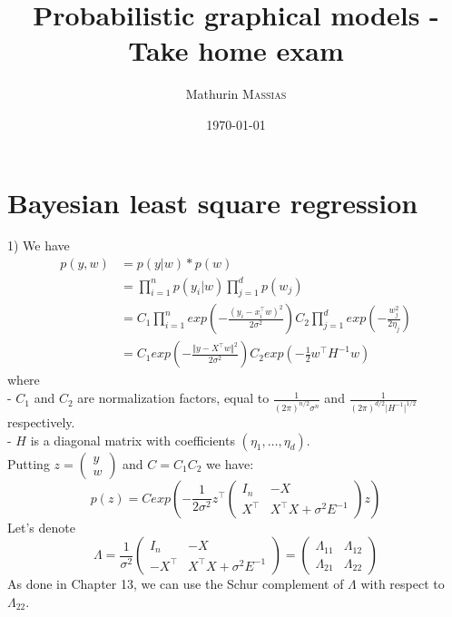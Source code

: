 \documentclass[11pt,a4paper]{article}
\begin{document}
	\title{Probabilistic graphical models - Take home exam}
	\author{Mathurin \textsc{Massias}}
	\date{\today} 
	\maketitle
\hspace{-6mm}

\section{Bayesian least square regression}

1) We have 
$$ \begin{aligned}p(y, w) 
&= p(y \vert w) * p(w) 
\\&= \prod\limits_{i=1}^{n} p(y_i \vert w) \prod\limits_{j=1}^{d} p( w_j)  
\\&=C_1 \prod\limits_{i=1}^{n} exp(- \frac{( y_i - x_i^{\top}w )^2 } {2 \sigma^2}) C_2 \prod\limits_{j=1}^{d} exp(- \frac{w_j^2}{2 \eta_j})
\\&=C_1 exp(- \frac{\Vert y- X^{\top}w \Vert^2 } {2 \sigma^2}) C_2 exp(-\frac{1}{2} w^{\top} H ^{-1} w)
\end{aligned}$$
where 
\\- $C_1$ and $C_2$ are normalization factors, equal to $\frac{1}{(2\pi)^{n/2} \sigma^n}$ and $\frac{1}{(2 \pi)^{d/2} \vert H^{-1} \vert^{1/2}}$ respectively.
\\- $H$ is a diagonal matrix with coefficients $(\eta_1, \ldots, \eta_d)$.
%
\\[5mm]Putting $z = \begin{pmatrix} y \\ w \end{pmatrix}$ and $C = C_1C_2$ we have:
$$p(z) = C exp (-\frac{1}{2\sigma^2} z^{\top} 
\begin{pmatrix} I_n & -X
\\ X^{\top} & X^{\top}X + \sigma^2 E^{-1} \end{pmatrix}
z)$$
%
Let's denote $$\Lambda = \frac{1}{\sigma^2}\begin{pmatrix} I_n & -X
\\ -X^{\top} & X^{\top}X + \sigma^2 E^{-1} \end{pmatrix}
 = \begin{pmatrix} \Lambda_{11} & \Lambda_{12}
\\ \Lambda_{21} & \Lambda_{22}  \end{pmatrix}
$$
As done in Chapter 13, we can use the Schur complement of $\Lambda$ with respect to $\Lambda_{22}$.
\end{document}
